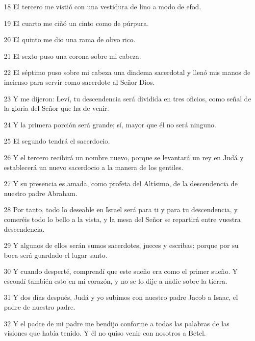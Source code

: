 \par 18 El tercero me vistió con una vestidura de lino a modo de efod.

\par 19 El cuarto me ciñó un cinto como de púrpura.

\par 20 El quinto me dio una rama de olivo rico.

\par 21 El sexto puso una corona sobre mi cabeza.

\par 22 El séptimo puso sobre mi cabeza una diadema sacerdotal y llenó mis manos de incienso para servir como sacerdote al Señor Dios.

\par 23 Y me dijeron: Leví, tu descendencia será dividida en tres oficios, como señal de la gloria del Señor que ha de venir.

\par 24 Y la primera porción será grande; sí, mayor que él no será ninguno.

\par 25 El segundo tendrá el sacerdocio.

\par 26 Y el tercero recibirá un nombre nuevo, porque se levantará un rey en Judá y establecerá un nuevo sacerdocio a la manera de los gentiles.

\par 27 Y su presencia es amada, como profeta del Altísimo, de la descendencia de nuestro padre Abraham.

\par 28 Por tanto, todo lo deseable en Israel será para ti y para tu descendencia, y comeréis todo lo bello a la vista, y la mesa del Señor se repartirá entre vuestra descendencia.

\par 29 Y algunos de ellos serán sumos sacerdotes, jueces y escribas; porque por su boca será guardado el lugar santo.

\par 30 Y cuando desperté, comprendí que este sueño era como el primer sueño. Y escondí también esto en mi corazón, y no se lo dije a nadie sobre la tierra.

\par 31 Y dos días después, Judá y yo subimos con nuestro padre Jacob a Isaac, el padre de nuestro padre.

\par 32 Y el padre de mi padre me bendijo conforme a todas las palabras de las visiones que había tenido. Y él no quiso venir con nosotros a Betel.

